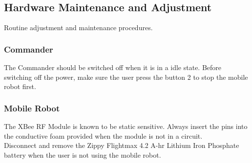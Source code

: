 \documentclass[11pt,a4paper]{article}
\begin{document}
  \subsection{Hardware Maintenance and Adjustment}
    Routine adjustment and maintenance procedures.
    \subsubsection{Commander}
    The Commander should be switched off when it is in a idle state. Before switching off the power, make sure the user press the button 2 to stop the mobile robot first.
    \subsubsection{Mobile Robot}
    The XBee RF Module is known to be static sensitive. Always insert the pins into the conductive foam provided when the module is not in a circuit. \\
    Disconnect and remove the Zippy Flightmax 4.2 A-hr Lithium Iron Phosphate battery when the user is not using the mobile robot.
\end{document}
